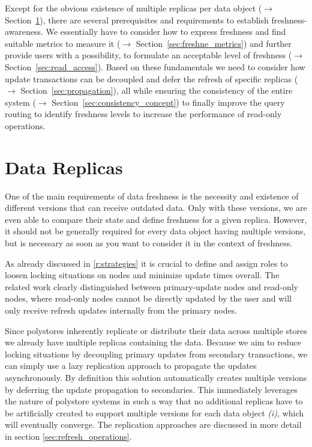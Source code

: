 Except for the obvious existence of multiple replicas per data object ($\rightarrow$ Section~\ref{sec:data_replicas}), 
there are several prerequisites and requirements to establish freshness-awareness. 
We essentially have to consider how to express freshness and find suitable metrics to measure it ($\rightarrow$ Section~\ref{sec:freshne_metrics})
and further provide users with a possibility, to formulate an acceptable level of freshness ($\rightarrow$ Section~\ref{sec:read_access}). 
Based on these fundamentals we need to consider how update transactions can be decoupled and defer the refresh of specific replicas 
($\rightarrow$ Section~\ref{sec:propagation}), all while ensuring the consistency of the entire system ($\rightarrow$ Section~\ref{sec:consistency_concept}) to finally 
improve the query routing to identify freshness levels to increase the performance of read-only operations. 



\section{Data Replicas}
\label{sec:data_replicas}

One of the main requirements of data freshness is the necessity and existence of different versions that can receive outdated data. 
Only with these versions, we are even able to compare their state and define freshness for a given replica.
However, it should not be generally required for every data object having multiple versions, but is necessary as soon 
as you want to consider it in the context of freshness.

As already discussed in \ref{r:strategies} it is crucial to define and assign roles to loosen locking situations on nodes
and minimize update times overall.
The related work clearly distinguished between primary-update nodes and read-only nodes, where 
read-only nodes cannot be directly updated by the user and will only receive refresh updates internally from the primary nodes.

Since polystores inherently replicate or distribute their data across multiple stores we already have multiple replicas containing the data. 
Because we aim to reduce locking situations by decoupling primary updates from secondary transactions,
we can simply use a lazy replication approach to propagate the updates asynchronously. 
By definition this solution automatically creates multiple versions by deferring the update propagation to secondaries.
This immediately leverages the nature of polystore systems in such a way that no additional replicas have to be artificially created
to support multiple versions for each data object \textit{(i)}, which will eventually converge. 
The replication approaches are discussed in more detail in section \ref{sec:refresh_operations}.

